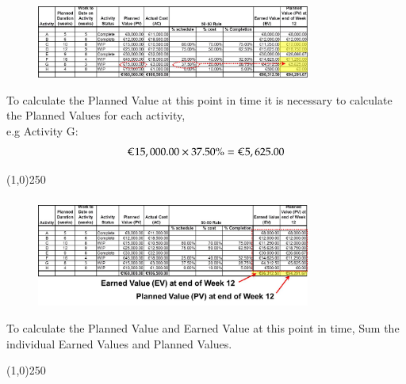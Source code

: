 \begin{frame}
\frametitle{}
\begin{figure}
	\centering
		\includegraphics[width = 9cm]{images/evmstep8.jpg}
	\label{fig:evmstep8}
\end{figure}
To calculate the Planned Value at this point in time it is necessary to calculate the Planned Values for each activity,\\ e.g Activity G:\\
\[
\text{\euro}15,000.00 \times 37.50\% = \text{\euro}5,625.00 
\]
\end{frame}
\begin{center}\line(1,0){250}\end{center}








\begin{frame}
\frametitle{}
\begin{figure}
	\centering
		\includegraphics[width = 9cm]{images/evmstep9.jpg}
	\label{fig:evmstep9}
\end{figure}
To calculate the Planned Value and Earned Value at this point in time, Sum the individual Earned Values and Planned Values.
\end{frame}
\begin{center}\line(1,0){250}\end{center}







